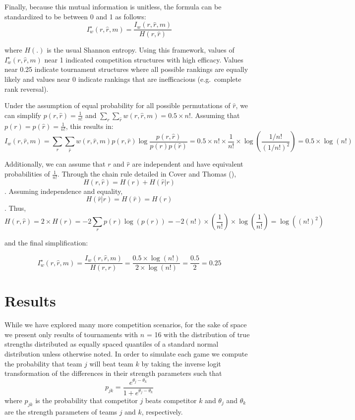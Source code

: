 \documentclass[
  12pt,
]{article}
\begin{document}
Finally, because this mutual information is unitless, the formula can be
standardized to be between 0 and 1 as follows: \[
I^{\star}_w(r,\hat{r},m) = \frac{I_w(r,\hat{r},m)}{H(r, \hat{r})}
\]

where \(H(.)\) is the usual Shannon entropy. Using this framework,
values of \(I^{\star}_w(r,\hat{r},m)\) near 1 indicated competition
structures with high efficacy. Values near 0.25 indicate tournament
structures where all possible rankings are equally likely and values
near 0 indicate rankings that are inefficacious (e.g.~complete rank
reversal).

Under the assumption of equal probability for all possible permutations
of \(\hat{r}\), we can simplify \(p(r, \hat{r}) = \frac{1}{n!}\) and
\(\sum_r \sum_{\hat{r}} w(r, \hat{r},m) = 0.5 \times n!\). Assuming that
\(p(r) = p(\hat{r}) = \frac{1}{n!}\), this results in: \[
I_w(r,\hat{r},m) = \sum_{r}\sum_{\hat{r}}w(r, \hat{r}, m)p(r,\hat{r})\log \frac {p(r,\hat{r})}{p(r)p(\hat{r})} = 0.5 \times n! \times \frac{1}{n!} \times \log(\frac{1/n!}{(1/n!)^2}) = 0.5 \times \log(n!)
\]

Additionally, we can assume that \(r\) and \(\hat{r}\) are independent
and have equivalent probabilities of \(\frac{1}{n!}\). Through the chain
rule detailed in Cover and Thomas (), \[
H(r, \hat{r}) = H(r) + H(\hat{r}|r)
\] . Assuming independence and equality, \[
H(\hat{r}|r) = H(\hat{r}) = H(r)
\] . Thus, \[
H(r,\hat{r}) = 2 \times H(r) = - 2 \sum_{r} p(r)\log(p(r)) = -2(n!) \times (\frac{1}{n!}) \times \log (\frac{1}{n!}) = \log((n!)^2)
\]

and the final simplification:

\[
I^{\star}_w(r,\hat{r},m) = \frac{I_w(r,\hat{r},m)}{H(r, \hat{r})} = \frac{0.5\times \log(n!)}{2\times \log(n!)} = \frac{0.5}{2} = 0.25
\]

\section{Results}\label{results}

While we have explored many more competition scenarios, for the sake of
space we present only results of tournaments with \(n\) = 16 with the
distribution of true strengths distributed as equally spaced quantiles
of a standard normal distribution unless otherwise noted. In order to
simulate each game we compute the probability that team \(j\) will beat
team \(k\) by taking the inverse logit transformation of the differences
in their strength parameters such that\\
\[
p_{jk} = \frac{e^{\theta_j - \theta_k}}{1 + e^{\theta_j - \theta_k}}
\] where \(p_{jk}\) is the probability that competitor \(j\) beats
competitor \(k\) and \(\theta_j\) and \(\theta_k\) are the strength
parameters of teams \(j\) and \(k\), respectively.
\end{document}
